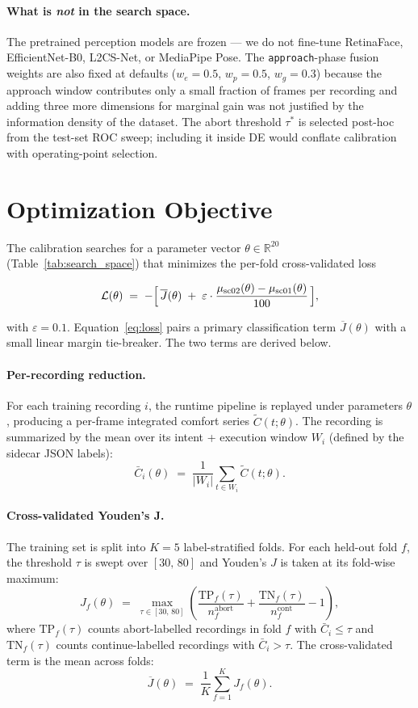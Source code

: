 \documentclass[11pt]{article}
\begin{document}
\paragraph{What is \emph{not} in the search space.}
The pretrained perception models are frozen --- we do not fine-tune
RetinaFace, EfficientNet-B0, L2CS-Net, or MediaPipe Pose. The
\texttt{approach}-phase fusion weights are also fixed at defaults
($w_e{=}0.5$, $w_p{=}0.5$, $w_g{=}0.3$) because the approach window
contributes only a small fraction of frames per recording and adding
three more dimensions for marginal gain was not justified by the
information density of the dataset. The abort threshold $\tau^{*}$ is
selected post-hoc from the test-set ROC sweep; including it inside DE
would conflate calibration with operating-point selection.

\clearpage
\section*{Optimization Objective}

\noindent
The calibration searches for a parameter vector
$\theta \in \mathbb{R}^{20}$ (Table~\ref{tab:search_space}) that minimizes
the per-fold cross-validated loss

\begin{equation}
\mathcal{L}(\theta)
\;=\; -\Bigl[\, \overline{J}(\theta)
\;+\; \varepsilon \cdot \frac{\mu_{\mathrm{sc02}}(\theta) - \mu_{\mathrm{sc01}}(\theta)}{100}\,\Bigr],
\label{eq:loss}
\end{equation}

with $\varepsilon = 0.1$. Equation~\eqref{eq:loss} pairs a primary
classification term $\overline{J}(\theta)$ with a small linear margin
tie-breaker. The two terms are derived below.

\paragraph{Per-recording reduction.}
For each training recording $i$, the runtime pipeline is replayed under
parameters $\theta$, producing a per-frame integrated comfort series
$\tilde{C}(t; \theta)$. The recording is summarized by the mean over its
intent + execution window $W_i$ (defined by the sidecar JSON labels):
\[
\bar{C}_i(\theta) \;=\; \frac{1}{|W_i|} \sum_{t \in W_i} \tilde{C}(t; \theta).
\]

\paragraph{Cross-validated Youden's J.}
The training set is split into $K{=}5$ label-stratified folds. For each
held-out fold $f$, the threshold $\tau$ is swept over $[30,\,80]$ and
Youden's $J$ is taken at its fold-wise maximum:
\[
J_f(\theta) \;=\; \max_{\tau \in [30,\,80]}
\left( \frac{\mathrm{TP}_f(\tau)}{n^{\mathrm{abort}}_f}
     + \frac{\mathrm{TN}_f(\tau)}{n^{\mathrm{cont}}_f}
     - 1 \right),
\]
where $\mathrm{TP}_f(\tau)$ counts abort-labelled recordings in fold $f$
with $\bar{C}_i \le \tau$ and $\mathrm{TN}_f(\tau)$ counts continue-labelled
recordings with $\bar{C}_i > \tau$. The cross-validated term is the mean
across folds:
\[
\overline{J}(\theta) \;=\; \frac{1}{K} \sum_{f=1}^{K} J_f(\theta).
\]
\end{document}
